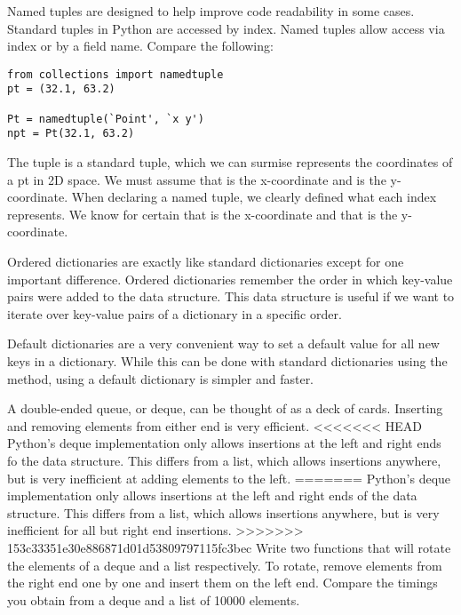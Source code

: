 Named tuples are designed to help improve code readability in some cases.
Standard tuples in Python are accessed by index.
Named tuples allow access via index or by a field name.
Compare the following:
\begin{lstlisting}
from collections import namedtuple
pt = (32.1, 63.2)

Pt = namedtuple(`Point', `x y')
npt = Pt(32.1, 63.2)
\end{lstlisting}
The tuple  is a standard tuple, which we can surmise represents the coordinates of a pt in 2D space.
We must assume that  is the x-coordinate and  is the y-coordinate.
When declaring a named tuple, we clearly defined what each index represents.
We know for certain that  is the x-coordinate and that  is the y-coordinate.

Ordered dictionaries are exactly like standard dictionaries except for one important difference.
Ordered dictionaries remember the order in which key-value pairs were added to the data structure.
This data structure is useful if we want to iterate over key-value pairs of a dictionary in a specific order.

Default dictionaries are a very convenient way to set a default value for all new keys in a dictionary.
While this can be done with standard dictionaries using the  method, using a default dictionary is simpler and faster.

\begin{problem}
A double-ended queue, or deque, can be thought of as a deck of cards.
Inserting and removing elements from either end is very efficient.
<<<<<<< HEAD
Python's deque implementation only allows insertions at the left and right ends fo the data structure.
This differs from a list, which allows insertions anywhere, but is very inefficient at adding elements to the left.
=======
Python's deque implementation only allows insertions at the left and right ends of the data structure.
This differs from a list, which allows insertions anywhere, but is very inefficient for all but right end insertions.
>>>>>>> 153c33351e30e886871d01d53809797115fc3bec
Write two functions that will rotate the elements of a deque and a list respectively.
To rotate, remove elements from the right end one by one and insert them on the left end.
Compare the timings you obtain from a deque and a list of 10000 elements.
\end{problem}

